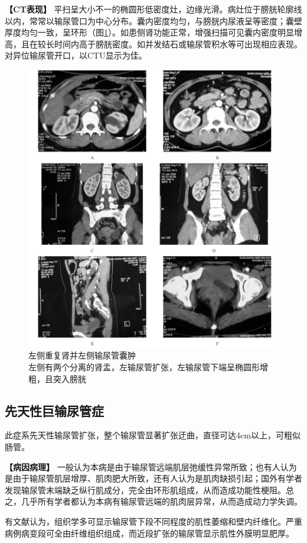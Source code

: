 \textbf{【CT表现】}
平扫呈大小不一的椭圆形低密度灶，边缘光滑。病灶位于膀胱轮廓线以内，常常以输尿管口为中心分布。囊内密度均匀，与膀胱内尿液呈等密度；囊壁厚度均匀一致，呈环形（图\ref{fig15-7}）。如患侧肾功能正常，增强扫描可见囊内密度明显增高，且在较长时间内高于膀胱密度。如并发结石或输尿管积水等可出现相应表现。对异位输尿管开口，以CTU显示为佳。

\begin{figure}[!htbp]
 \centering
 \includegraphics[width=.7\textwidth,height=\textheight,keepaspectratio]{./images/Image00322.jpg}
 \captionsetup{justification=centering}
 \caption{左侧重复肾并左侧输尿管囊肿\\{\small 左侧有两个分离的肾盂，左输尿管扩张，左输尿管下端呈椭圆形增粗，且突入膀胱}}
 \label{fig15-7}
  \end{figure} 

\subsection{先天性巨输尿管症}

此症系先天性输尿管扩张，整个输尿管显著扩张迂曲，直径可达4cm以上，可粗似肠管。

\textbf{【病因病理】}
一般认为本病是由于输尿管远端肌层弛缓性异常所致；也有人认为是由于输尿管肌层增厚、肌肉肥大所致，还有人认为是肌肉缺损引起；国外有学者发现输尿管末端缺乏纵行肌成分，完全由环形肌组成，从而造成功能性梗阻。总之，几乎所有学者都认为本病有输尿管远端的肌肉层异常，从而造成动力学失调。

有文献认为，组织学多可显示输尿管下段不同程度的肌性萎缩和壁内纤维化。严重病例病变段可全由纤维组织组成，而近段扩张的输尿管显示肌性外膜明显肥厚。

